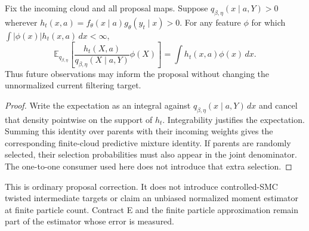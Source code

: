 \begin{proposition}
\label{prop:sir-neural-physical-correction}
Fix the incoming cloud and all proposal maps. Suppose
\(q_{\beta,\eta}(x\mid a,Y)>0\) wherever
\(h_t(x,a)=f_\theta(x\mid a)g_\theta(y_t\mid x)>0\).
For any feature \(\phi\) for which \(\int |\phi(x)|h_t(x,a)\,dx<\infty\),
\[
 \mathbb E_{q_{\beta,\eta}}\!\left[
 \frac{h_t(X,a)}{q_{\beta,\eta}(X\mid a,Y)}\phi(X)\right]
 =\int h_t(x,a)\phi(x)\,dx.
\]
Thus future observations may inform the proposal without changing the
unnormalized current filtering target.
\end{proposition}
\begin{proof}
Write the expectation as an integral against
\(q_{\beta,\eta}(x\mid a,Y)\,dx\) and cancel that density pointwise on
the support of \(h_t\). Integrability justifies the expectation. Summing this
identity over parents with their incoming weights gives the corresponding
finite-cloud predictive mixture identity. If parents are randomly selected,
their selection probabilities must also appear in the joint denominator.
The one-to-one consumer used here does not introduce that extra selection.
\end{proof}

This is ordinary proposal correction. It does not introduce controlled-SMC
twisted intermediate targets or claim an unbiased normalized moment estimator
at finite particle count. Contract E and the finite particle approximation
remain part of the estimator whose error is measured.

